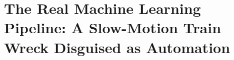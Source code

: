 \part{The Real Machine Learning Pipeline: A Slow-Motion Train Wreck Disguised as Automation}
%
%
%
%
%
%
%
%
